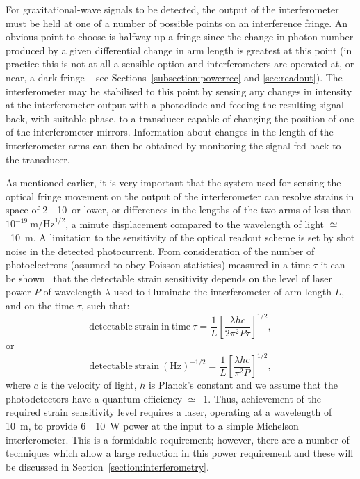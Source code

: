 For gravitational-wave signals to be detected, the output of the interferometer
must be held at one of a number of possible points on an interference fringe. An
obvious point to choose is halfway up a fringe since the change in photon number
produced by a given differential change in arm length is greatest at this
point (in practice this is not at all a sensible option and interferometers
are operated at, or near, a dark fringe -- see
Sections~\ref{subsection:powerrec} and \ref{sec:readout}). The
interferometer may be stabilised to this point by sensing any changes
in intensity at the interferometer output with a photodiode and
feeding the resulting signal back, with suitable phase, to a
transducer capable of changing the position of one of the
interferometer mirrors.  Information about changes in the length of
the interferometer arms can then be obtained by monitoring the signal
fed back to the transducer.


As mentioned earlier, it is very important that the system used for sensing the
optical fringe movement on the output of the interferometer can resolve strains
in space of 2~\texttimes~10~\Hz or lower, or differences in the
lengths of the two arms of less than $10^{-19} \mathrm{\ m/Hz}^{1/2}$,
a minute displacement compared to the wavelength of light
$\simeq$~10~m. A limitation to the sensitivity of the
optical readout scheme is set by shot noise in the detected photocurrent. From
consideration of the number of photoelectrons (assumed to obey Poisson
statistics) measured in a time $\tau$ it can be shown~\cite{HoughMG5}
that the detectable strain sensitivity depends on the level of laser
power $P$ of wavelength $\lambda$ used to illuminate the
interferometer of arm length $L$, and on the time $\tau$, such that:
\begin{equation}
  \mathrm{detectable\ strain\ in\ time\ } \tau = \frac 1{L}\left[\frac{\lambda h
  c}{2 \pi^{2} P \tau}\right]^{1/2},
  \label{equation:shot1}
\end{equation}
or
\begin{equation}
  \mathrm{detectable\ strain\ }(\mathrm{Hz})^{-1/2} = \frac
  1{L}\left[\frac{\lambda h c}{\pi^{2} P }\right]^{1/2},
  \label{equation:shot2}
\end{equation}
where $c$ is the velocity of light, $h$ is Planck's constant and we assume
that the photodetectors have a quantum efficiency $\simeq$~1. Thus, achievement
of the required strain sensitivity level requires a laser, operating at a
wavelength of 10~m, to provide 6~\texttimes~10~W
power at the input to a simple Michelson interferometer. This is a
formidable requirement; however, there are a number of techniques which
allow a large reduction in this power requirement and these will be
discussed in Section~\ref{section:interferometry}.


